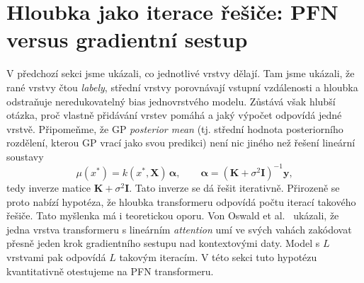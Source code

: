 \section{Hloubka jako iterace řešiče: PFN versus gradientní sestup}
\label{sec:hloubka-reseni}

V předchozí sekci jsme ukázali, co jednotlivé vrstvy dělají.
Tam jsme ukázali, že rané vrstvy čtou \emph{labely}, střední vrstvy porovnávají vstupní vzdálenosti a hloubka odstraňuje neredukovatelný bias jednovrstvého modelu.
Zůstává však hlubší otázka, proč vlastně přidávání vrstev pomáhá a jaký výpočet odpovídá jedné vrstvě.
Připomeňme, že GP \emph{posterior mean} (tj. střední hodnota posteriorního rozdělení, kterou GP vrací jako svou predikci) není nic jiného než řešení lineární soustavy
$$\mu(x^*) = k(x^*, \mathbf{X})\,\boldsymbol{\alpha}, \qquad \boldsymbol{\alpha} = (\mathbf{K} + \sigma^2 \mathbf{I})^{-1} \mathbf{y},$$
tedy inverze matice $\mathbf{K} + \sigma^2 \mathbf{I}$.
Tato inverze se dá řešit iterativně.
Přirozeně se proto nabízí hypotéza, že hloubka transformeru odpovídá počtu iterací takového řešiče.
Tato myšlenka má i teoretickou oporu.
Von Oswald et al.~\cite{vonoswald2023} ukázali, že jedna vrstva transformeru s lineárním \emph{attention} umí ve svých vahách zakódovat přesně jeden krok gradientního sestupu nad kontextovými daty.
Model s $L$ vrstvami pak odpovídá $L$ takovým iteracím.
V této sekci tuto hypotézu kvantitativně otestujeme na PFN transformeru.
\par

